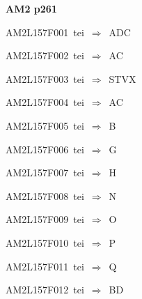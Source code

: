 \par\vfill\eject
{\bf\hfill AM2 p261\hfill\hbox{}}\par\bigskip
{\sixrm AM2L157F001\ {\sixit tei}\ }$\Rightarrow$\ ADC\par\smallskip
{\sixrm AM2L157F002\ {\sixit tei}\ }$\Rightarrow$\ AC\par\smallskip
{\sixrm AM2L157F003\ {\sixit tei}\ }$\Rightarrow$\ STVX\par\smallskip
{\sixrm AM2L157F004\ {\sixit tei}\ }$\Rightarrow$\ AC\par\smallskip
{\sixrm AM2L157F005\ {\sixit tei}\ }$\Rightarrow$\ B\par\smallskip
{\sixrm AM2L157F006\ {\sixit tei}\ }$\Rightarrow$\ G\par\smallskip
{\sixrm AM2L157F007\ {\sixit tei}\ }$\Rightarrow$\ H\par\smallskip
{\sixrm AM2L157F008\ {\sixit tei}\ }$\Rightarrow$\ N\par\smallskip
{\sixrm AM2L157F009\ {\sixit tei}\ }$\Rightarrow$\ O\par\smallskip
{\sixrm AM2L157F010\ {\sixit tei}\ }$\Rightarrow$\ P\par\smallskip
{\sixrm AM2L157F011\ {\sixit tei}\ }$\Rightarrow$\ Q\par\smallskip
{\sixrm AM2L157F012\ {\sixit tei}\ }$\Rightarrow$\ BD\par\smallskip

